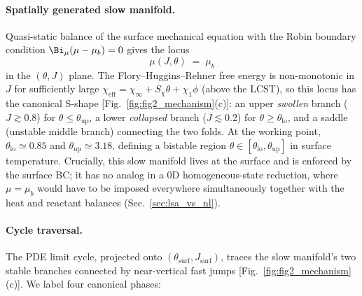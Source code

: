\paragraph{Spatially generated slow manifold.}
Quasi-static balance of the surface mechanical equation with the
Robin boundary condition $\Bi_\mu(\mu - \mu_b) = 0$ gives the locus
\begin{equation}
  \mu(J,\theta) \;=\; \mu_b
  \label{eq:slow_manifold}
\end{equation}
in the $(\theta, J)$ plane.  The Flory--Huggins--Rehner free energy
is non-monotonic in $J$ for sufficiently large $\chi_\mathrm{eff}=
\chi_\infty + S_\chi\theta + \chi_1 \phi$ (above the LCST), so this
locus has the canonical S-shape
[Fig.~\ref{fig:fig2_mechanism}(c)]: an upper \emph{swollen} branch
($J \gtrsim 0.8$) for $\theta \le \theta_\mathrm{up}$, a lower
\emph{collapsed} branch ($J \lesssim 0.2$) for
$\theta \ge \theta_\mathrm{lo}$, and a saddle (unstable middle
branch) connecting the two folds. At the working point,
$\theta_\mathrm{lo}\!\simeq\!0.85$ and
$\theta_\mathrm{up}\!\simeq\!3.18$, defining a bistable region
$\theta\in[\theta_\mathrm{lo},\theta_\mathrm{up}]$ in surface
temperature.  Crucially, this slow manifold lives at the surface and
is enforced by the surface BC; it has no analog in a 0D
homogeneous-state reduction, where $\mu = \mu_b$ would have to be
imposed everywhere simultaneously together with the heat and reactant
balances (Sec.~\ref{sec:lsa_vs_nl}).

\paragraph{Cycle traversal.}  The PDE limit cycle, projected onto
$(\theta_\mathrm{surf}, J_\mathrm{surf})$, traces the slow manifold's
two stable branches connected by near-vertical fast jumps
[Fig.~\ref{fig:fig2_mechanism}(c)].  We label four canonical phases:

